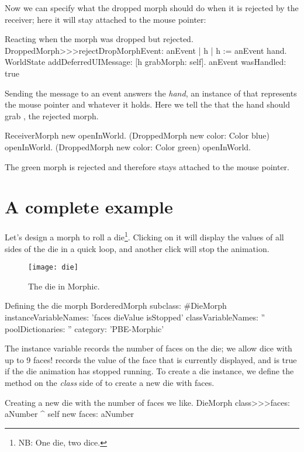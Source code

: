 \documentclass[a4paper,10pt,twoside]{book}
\begin{document}
Now we can specify what the dropped morph should do when it is rejected by the receiver; here it will stay attached to the mouse pointer:
\begin{method}{Reacting when the morph was dropped but rejected.}
DroppedMorph>>>rejectDropMorphEvent: anEvent
	| h |
	h := anEvent hand.
	WorldState
		addDeferredUIMessage: [h grabMorph: self].
	anEvent wasHandled: true
\end{method}

Sending the  message to an event answers the \emph{hand}, an instance of  that represents the mouse pointer and whatever it holds.
Here we tell the  that the hand should grab , the rejected morph.

\begin{code}{}
ReceiverMorph new openInWorld.
(DroppedMorph new color: Color blue) openInWorld.
(DroppedMorph new color: Color green) openInWorld.
\end{code}
\noindent
The green morph is rejected and therefore stays attached to the mouse pointer.

\section{A complete example}

Let's design a morph to roll a die\footnote{NB: One die, two dice.}. Clicking on it will display the values of all sides of the die in a quick loop, and another click will stop the animation.

\begin{figure}[ht]
	\centerline{\texttt{[image: die]}}
	\caption{The die in Morphic.
		}
\end{figure}


\begin{classdef}{Defining the die morph}
BorderedMorph subclass: #DieMorph
	instanceVariableNames: 'faces dieValue isStopped'
	classVariableNames: ''
	poolDictionaries: ''
	category: 'PBE-Morphic'
\end{classdef}

The instance variable  records the number of faces on the die; we allow dice with up to 9 faces!  records the value of the face that is currently displayed, and  is true if the die animation has stopped running.
To create a die instance, we define the  method on the \emph{class} side of  to create a new die with  faces.
\begin{method}{Creating a new die with the number of faces we like.}
DieMorph class>>>faces: aNumber
	^ self new faces: aNumber
\end{method}
\end{document}
